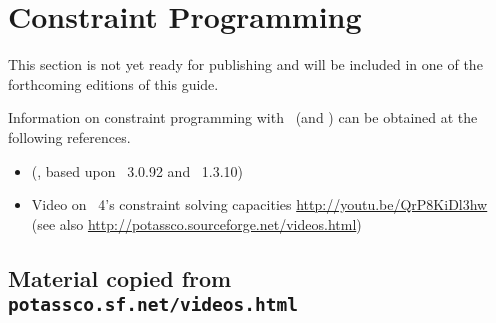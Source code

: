 \section{Constraint Programming}\label{sec:constraint}

This section is not yet ready for publishing
and will be included in one of the forthcoming editions of this guide.

Information on constraint programming with \gringo\ (and \clingcon) can be obtained at the following references.

\begin{itemize}
\item \cite{geossc09a,ostsch12a} (\clingcon, based upon \gringo~3.0.92 and \clasp~1.3.10)
\item Video on \gringo~4's constraint solving capacities \url{http://youtu.be/QrP8KiDl3hw} (see also \url{http://potassco.sourceforge.net/videos.html})
\end{itemize}


\subsection{Material copied from \texttt{potassco.sf.net/videos.html}}

